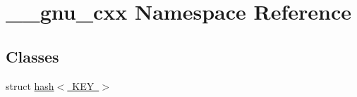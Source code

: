 \hypertarget{namespace____gnu__cxx}{}\section{\+\_\+\+\_\+gnu\+\_\+cxx Namespace Reference}
\label{namespace____gnu__cxx}
\subsection*{Classes}
\begin{DoxyCompactItemize}
\item 
struct \mbox{\hyperlink{struct____gnu__cxx_1_1hash_3_01KEY_01_4}{hash$<$ K\+E\+Y $>$}}
\end{DoxyCompactItemize}
